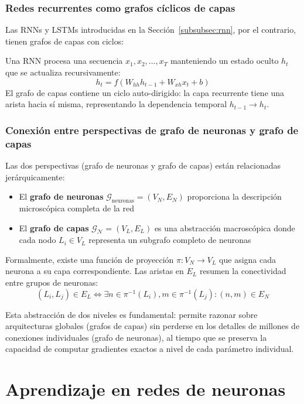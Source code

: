 \subsubsection{Redes recurrentes como grafos cíclicos de capas}

Las \glspl{RNN} y \glspl{LSTM} introducidas en la Sección~\ref{subsubsec:rnn}, por el contrario, tienen grafos de capas con ciclos:

\begin{example}
Una \gls{RNN} procesa una secuencia $x_1, x_2, \ldots, x_T$ manteniendo un estado oculto $h_t$ que se actualiza recursivamente:
\[
h_t = f(W_{hh} h_{t-1} + W_{xh} x_t + b)
\]
El grafo de capas contiene un ciclo auto-dirigido: la capa recurrente tiene una arista hacia sí misma, representando la dependencia temporal $h_{t-1} \to h_t$.
\end{example}

\subsubsection{Conexión entre perspectivas de grafo de neuronas y grafo de capas}

Las dos perspectivas (grafo de neuronas y grafo de capas) están relacionadas jerárquicamente:
\begin{itemize}
    \item El \textbf{grafo de neuronas} $\mathcal{G}_{\text{neuronas}} = (V_N, E_N)$ proporciona la descripción microscópica completa de la red
    \item El \textbf{grafo de capas} $\mathcal{G}_{\mathcal{N}} = (V_L, E_L)$ es una abstracción macroscópica donde cada nodo $L_i \in V_L$ representa un subgrafo completo de neuronas
\end{itemize}

Formalmente, existe una función de proyección $\pi: V_N \to V_L$ que asigna cada neurona a su capa correspondiente. Las aristas en $E_L$ resumen la conectividad entre grupos de neuronas:
\[
(L_i, L_j) \in E_L \iff \exists n \in \pi^{-1}(L_i), m \in \pi^{-1}(L_j) : (n, m) \in E_N
\]

Esta abstracción de dos niveles es fundamental: permite razonar sobre arquitecturas globales (grafos de capas) sin perderse en los detalles de millones de conexiones individuales (grafo de neuronas), al tiempo que se preserva la capacidad de computar gradientes exactos a nivel de cada parámetro individual.

\section{Aprendizaje en redes de neuronas}\label{sec:learning_ann}

